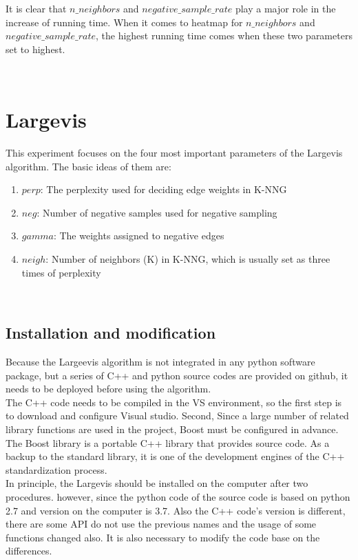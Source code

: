 \begin{enumerate}[1)]
It is clear that $n\_neighbors$ and $negative\_sample\_rate$  play a major role in the increase of running time. When it comes to heatmap for $n\_neighbors$ and $negative\_sample\_rate$, the highest running time comes when these two parameters set to highest.

\end{enumerate}\\

\section{Largevis}

This experiment focuses on the four most important parameters of the Largevis algorithm. The basic ideas of them are:

\begin{enumerate}[1)]
\item $perp$: The perplexity used for deciding edge weights in K-NNG
\item $neg$: Number of negative samples used for negative sampling
\item $gamma$: The weights assigned to negative edges
\item $neigh$: Number of neighbors (K) in K-NNG, which is usually set as three times of perplexity
\end{enumerate}\\

\subsection{Installation and modification}

Because the Largeevis algorithm is not integrated in any python software package, but a series of C++ and python source codes are provided on github, it needs to be deployed before using the algorithm. \\

\noindent The C++ code needs to be compiled in the VS environment, so the first step is to download and configure Visual studio. Second, Since a large number of related library functions are used in the project, Boost must be configured in advance. The Boost library is a portable C++ library that provides source code. As a backup to the standard library, it is one of the development engines of the C++ standardization process.\\

\noindent In principle, the Largevis should be installed on the computer after two procedures. however, since the python code of the source code is based on python 2.7 and version on the computer is 3.7. Also the C++ code's version is different, there are some API do not use the previous names and the usage of some functions changed also. It is also necessary to modify the code base on the differences. 

